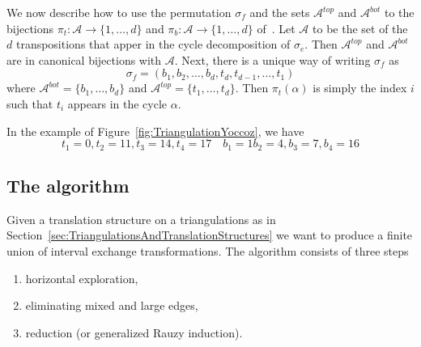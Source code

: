 \documentclass{article}
\def\cA{\mathcal{A}}
\begin{document}
We now describe how to use the permutation $\sigma_f$ and the sets $\cA^{top}$ and $\cA^{bot}$
to the bijections $\pi_t:\cA \to \{1,\ldots,d\}$ and $\pi_b: \cA \to \{1,\ldots,d\}$ of~\cite{Yoccoz}.
Let $\cA$ to be the set of the $d$ transpositions that apper in the cycle decomposition
of $\sigma_e$. Then $\cA^{top}$ and $\cA^{bot}$ are in canonical bijections with $\cA$.
Next, there is a unique way of writing $\sigma_f$ as
\[
\sigma_f = (b_1, b_2, \ldots, b_d, t_d, t_{d-1}, \ldots, t_1)
\]
where $\cA^{bot} = \{b_1, \ldots, b_d\}$ and $\cA^{top} = \{t_1, \ldots, t_d\}$.
Then $\pi_t(\alpha)$ is simply the index $i$ such that $t_i$ appears in the cycle $\alpha$.

In the example of Figure~\ref{fig:TriangulationYoccoz}, we have
\[
t_1 = 0, t_2 = 11, t_3 = 14, t_4 = 17
\quad
b_1 = 1 b_2 = 4, b_3 = 7, b_4 = 16
\]

\subsection{The algorithm}
Given a translation structure on a triangulations as in
Section~\ref{sec:TriangulationsAndTranslationStructures} we
want to produce a finite union of interval exchange transformations.
The algorithm consists of three steps
\begin{enumerate}
\item horizontal exploration,
\item eliminating mixed and large edges,
\item reduction (or generalized Rauzy induction).
\end{enumerate}

%
%
%
%
\end{document}
